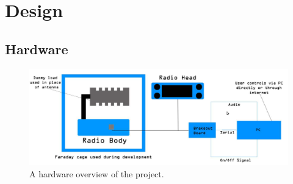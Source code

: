\chapter{Design}
\label{section:design}




\section{Hardware}
\begin{figure}
    \centering
    \includegraphics[width=\textwidth]{img/setup_diagram}
    \caption[Hardware Overview]{A hardware overview of the project.}
    \label{fig:setup_diagram}
\end{figure}

